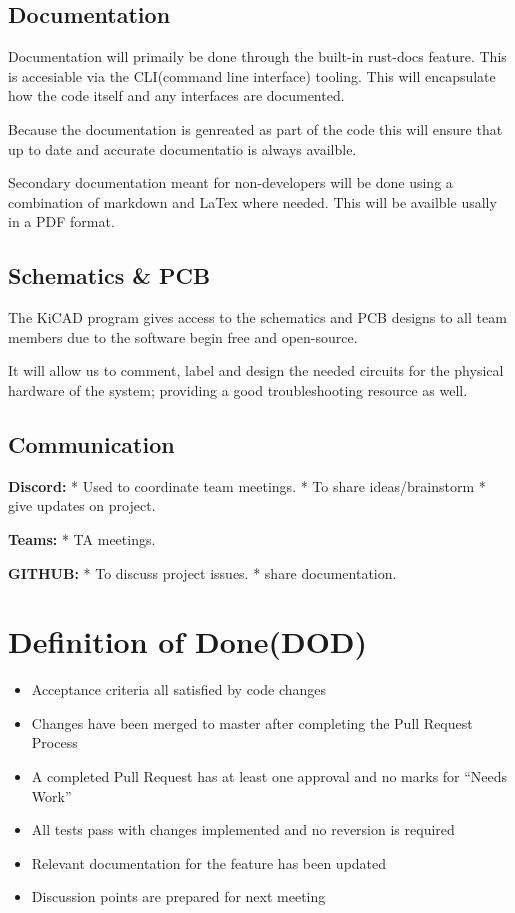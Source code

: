\hypertarget{documentation}{%
\subsection{Documentation}\label{documentation}}

Documentation will primaily be done through the built-in rust-docs
feature. This is accesiable via the CLI(command line interface) tooling.
This will encapsulate how the code itself and any interfaces are
documented.

Because the documentation is genreated as part of the code this will
ensure that up to date and accurate documentatio is always availble.

Secondary documentation meant for non-developers will be done using a
combination of markdown and LaTex where needed. This will be availble
usally in a PDF format.

\hypertarget{schematics-pcb}{%
\subsection{Schematics \& PCB}\label{schematics-pcb}}

The KiCAD program gives access to the schematics and PCB designs to all
team members due to the software begin free and open-source.

It will allow us to comment, label and design the needed circuits for
the physical hardware of the system; providing a good troubleshooting
resource as well.

\hypertarget{communication}{%
\subsection{Communication}\label{communication}}

\textbf{Discord:} * Used to coordinate team meetings. * To share
ideas/brainstorm * give updates on project.

\textbf{Teams:} * TA meetings.

\textbf{GITHUB:} * To discuss project issues. * share documentation.

\hypertarget{definition-of-donedod}{%
\section{Definition of Done(DOD)}\label{definition-of-donedod}}

\begin{itemize}
\tightlist
\item
  Acceptance criteria all satisfied by code changes
\item
  Changes have been merged to master after completing the Pull Request
  Process
\item
  A completed Pull Request has at least one approval and no marks for
  ``Needs Work''
\item
  All tests pass with changes implemented and no reversion is required
\item
  Relevant documentation for the feature has been updated
\item
  Discussion points are prepared for next meeting
\end{itemize}

